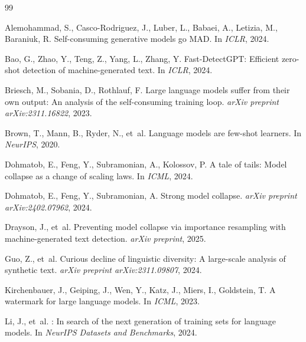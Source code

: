 \documentclass[11pt,a4paper]{article}
\begin{document}
\begin{thebibliography}{99}

Alemohammad, S., Casco-Rodriguez, J., Luber, L., Babaei, A., Letizia, M., Baraniuk, R.
\newblock Self-consuming generative models go MAD.
\newblock In \emph{ICLR}, 2024.

Bao, G., Zhao, Y., Teng, Z., Yang, L., Zhang, Y.
\newblock Fast-{DetectGPT}: Efficient zero-shot detection of machine-generated text.
\newblock In \emph{ICLR}, 2024.

Briesch, M., Sobania, D., Rothlauf, F.
\newblock Large language models suffer from their own output: An analysis of the self-consuming training loop.
\newblock \emph{arXiv preprint arXiv:2311.16822}, 2023.

Brown, T., Mann, B., Ryder, N., et~al.
\newblock Language models are few-shot learners.
\newblock In \emph{NeurIPS}, 2020.

Dohmatob, E., Feng, Y., Subramonian, A., Kolossov, P.
\newblock A tale of tails: Model collapse as a change of scaling laws.
\newblock In \emph{ICML}, 2024.

Dohmatob, E., Feng, Y., Subramonian, A.
\newblock Strong model collapse.
\newblock \emph{arXiv preprint arXiv:2402.07962}, 2024.

Drayson, J., et~al.
\newblock Preventing model collapse via importance resampling with machine-generated text detection.
\newblock \emph{arXiv preprint}, 2025.

Guo, Z., et~al.
\newblock Curious decline of linguistic diversity: A large-scale analysis of synthetic text.
\newblock \emph{arXiv preprint arXiv:2311.09807}, 2024.

Kirchenbauer, J., Geiping, J., Wen, Y., Katz, J., Miers, I., Goldstein, T.
\newblock A watermark for large language models.
\newblock In \emph{ICML}, 2023.

Li, J., et~al.
: In search of the next generation of training sets for language models.
\newblock In \emph{NeurIPS Datasets and Benchmarks}, 2024.


\end{thebibliography}
\end{document}

